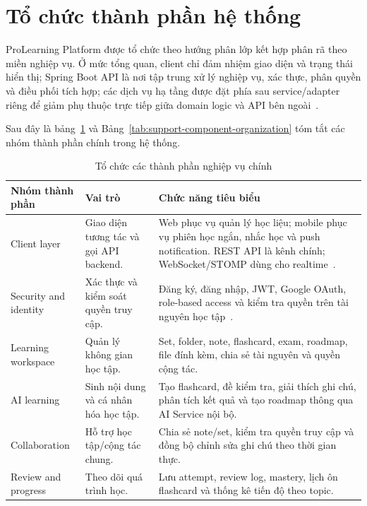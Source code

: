 \section{Tổ chức thành phần hệ thống}
\label{sec:system-component-organization}
\begingroup
\sloppy

ProLearning Platform được tổ chức theo hướng phân lớp kết hợp phân rã theo miền nghiệp vụ. Ở mức tổng quan, client chỉ đảm nhiệm giao diện và trạng thái hiển thị; Spring Boot API là nơi tập trung xử lý nghiệp vụ, xác thực, phân quyền và điều phối tích hợp; các dịch vụ hạ tầng được đặt phía sau service/adapter riêng để giảm phụ thuộc trực tiếp giữa domain logic và API bên ngoài~\cite{springbootdocs,springsecurityjwt}.

Sau đây là bảng~\ref{tab:core-component-organization} và Bảng~\ref{tab:support-component-organization} tóm tắt các nhóm thành phần chính trong hệ thống.

\begin{table}[htbp]
    \centering
    \small
    \caption{Tổ chức các thành phần nghiệp vụ chính}
    \label{tab:core-component-organization}
    \renewcommand{\arraystretch}{1.15}
    \begin{tabular}{|p{}|p{}|p{}|}
        \hline
        \textbf{Nhóm thành phần} & \textbf{Vai trò} & \textbf{Chức năng tiêu biểu} \\
        \hline
        Client layer & Giao diện tương tác và gọi API backend. & Web phục vụ quản lý học liệu; mobile phục vụ phiên học ngắn, nhắc học và push notification. REST API là kênh chính; WebSocket/STOMP dùng cho realtime~\cite{springwebsocketstomp}. \\
        \hline
        Security and identity & Xác thực và kiểm soát quyền truy cập. & Đăng ký, đăng nhập, JWT, Google OAuth, role-based access và kiểm tra quyền trên tài nguyên học tập~\cite{springsecurityjwt}. \\
        \hline
        Learning workspace & Quản lý không gian học tập. & Set, folder, note, flashcard, exam, roadmap, file đính kèm, chia sẻ tài nguyên và quyền cộng tác. \\
        \hline
        AI learning & Sinh nội dung và cá nhân hóa học tập. & Tạo flashcard, đề kiểm tra, giải thích ghi chú, phân tích kết quả và tạo roadmap thông qua AI Service nội bộ. \\
        \hline
        Collaboration & Hỗ trợ học tập/cộng tác chung. & Chia sẻ note/set, kiểm tra quyền truy cập và đồng bộ chỉnh sửa ghi chú theo thời gian thực. \\
        \hline
        Review and progress & Theo dõi quá trình học. & Lưu attempt, review log, mastery, lịch ôn flashcard và thống kê tiến độ theo topic. \\
        \hline
    \end{tabular}
\end{table}

